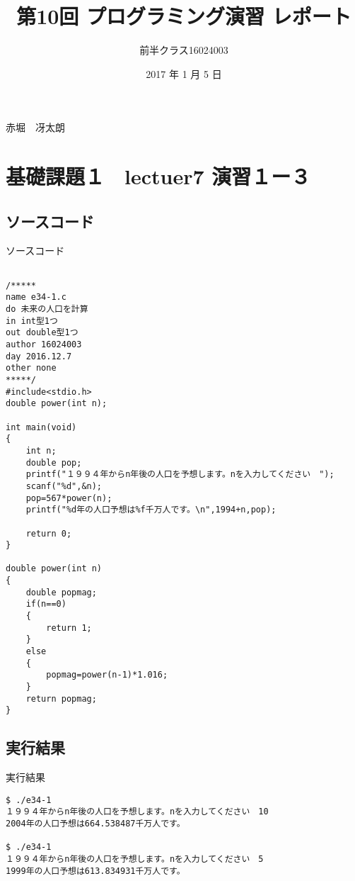 \documentclass[a4j,titlepage]{jarticle}
\begin{document}

\title{第10回 プログラミング演習 レポート}

\author{前半クラス16024003}{赤堀　冴太朗}

\date{2017 年 1 月 5 日}
\maketitle


\section{基礎課題１　lectuer7 演習１ー３}
\subsection{ソースコード}
\begin{breakitembox}[l]{ソースコード}
\begin{verbatim}

/*****
name e34-1.c
do 未来の人口を計算
in int型1つ
out double型1つ
author 16024003
day 2016.12.7
other none
*****/
#include<stdio.h>
double power(int n);

int main(void)
{
    int n;
    double pop;
    printf("１９９４年からn年後の人口を予想します。nを入力してください　");
    scanf("%d",&n);
    pop=567*power(n);
    printf("%d年の人口予想は%f千万人です。\n",1994+n,pop);

    return 0;
}

double power(int n)
{
    double popmag;
    if(n==0)
    {
        return 1;
    }
    else
    {
        popmag=power(n-1)*1.016;
    }
    return popmag;
}

\end{verbatim}
\end{breakitembox}

\subsection{実行結果}
\begin{itembox}[l]{実行結果}
\begin{verbatim}
$ ./e34-1
１９９４年からn年後の人口を予想します。nを入力してください　10
2004年の人口予想は664.538487千万人です。

$ ./e34-1
１９９４年からn年後の人口を予想します。nを入力してください　5
1999年の人口予想は613.834931千万人です。
\end{verbatim}
\end{itembox}
\end{document}
